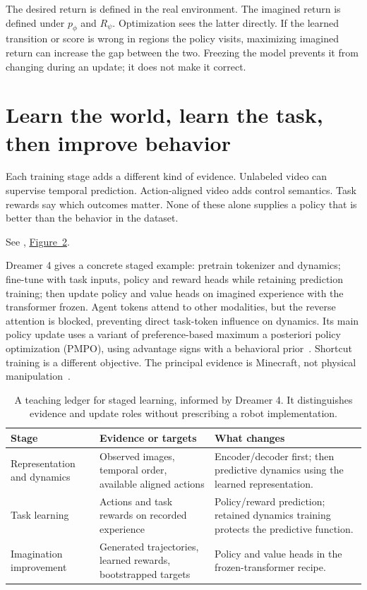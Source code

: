 The desired return is defined in the real environment. The imagined return is defined under $p_\phi$ and $R_\psi$. Optimization sees the latter directly. If the learned transition or score is wrong in regions the policy visits, maximizing imagined return can increase the gap between the two. Freezing the model prevents it from changing during an update; it does not make it correct.

\section{Learn the world, learn the task, then improve behavior}
Each training stage adds a different kind of evidence. Unlabeled video can supervise temporal prediction. Action-aligned video adds control semantics. Task rewards say which outcomes matter. None of these alone supplies a policy that is better than the behavior in the dataset.

\noindent See \citet{dreamer4}, \href{https://arxiv.org/pdf/2509.24527v1}{Figure~2}.


Dreamer 4 gives a concrete staged example: pretrain tokenizer and dynamics; fine-tune with task inputs, policy and reward heads while retaining prediction training; then update policy and value heads on imagined experience with the transformer frozen. Agent tokens attend to other modalities, but the reverse attention is blocked, preventing direct task-token influence on dynamics. Its main policy update uses a variant of preference-based maximum a posteriori policy optimization (PMPO), using advantage signs with a behavioral prior~\citep{pmpo}. Shortcut training is a different objective. The principal evidence is Minecraft, not physical manipulation~\citep[Alg.~1 and Sec.~3.3]{dreamer4}.

\begin{table}[H]\centering\small
\caption{A teaching ledger for staged learning, informed by Dreamer 4. It distinguishes evidence and update roles without prescribing a robot implementation.}
\begin{tabularx}{\linewidth}{@{}>{\raggedright\arraybackslash}p{25mm}YY@{}}\toprule
Stage & Evidence or targets & What changes\\\midrule
Representation and dynamics & Observed images, temporal order, available aligned actions & Encoder/decoder first; then predictive dynamics using the learned representation.\\
Task learning & Actions and task rewards on recorded experience & Policy/reward prediction; retained dynamics training protects the predictive function.\\
Imagination improvement & Generated trajectories, learned rewards, bootstrapped targets & Policy and value heads in the frozen-transformer recipe.\\\bottomrule
\end{tabularx}
\end{table}

